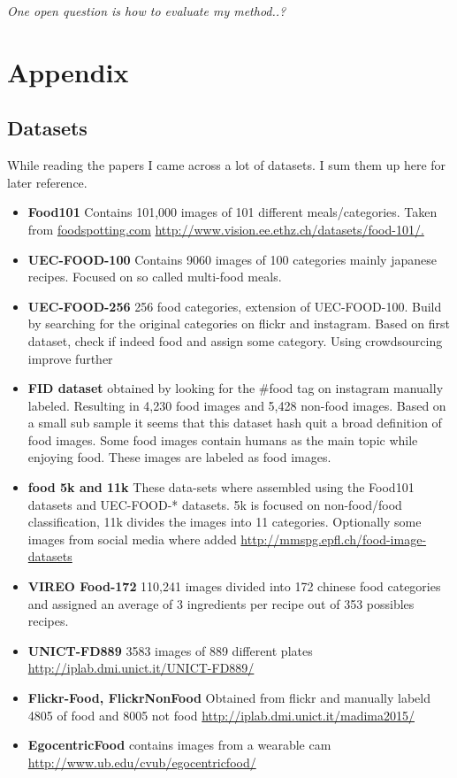 \documentclass[a4paper]{scrartcl}
\begin{document}
\textit{One open question is how to evaluate my method..?}


\section{Appendix}
\subsection{Datasets}

While reading the papers I came across a lot of datasets. I sum them up here for later reference. 
\begin{itemize}
\item \textbf{Food101} Contains 101,000 images of 101 different meals/categories. Taken from \url{foodspotting.com} \url{http://www.vision.ee.ethz.ch/datasets/food-101/.} \cite{bossard2014food}
\item \textbf{UEC-FOOD-100} Contains 9060 images of 100 categories mainly japanese recipes. Focused on so called multi-food meals. \cite{matsuda2012recognition}
\item \textbf{UEC-FOOD-256} 256 food categories, extension of UEC-FOOD-100. Build by searching for the original categories on flickr and instagram. Based on first dataset, check if indeed food and assign some category. Using crowdsourcing improve further \cite{kawano2014automatic}
\item \textbf{FID  dataset} obtained by looking for the \#food tag on instagram manually labeled. Resulting in 4,230
food images and 5,428 non-food images. Based on a small sub sample it seems that this dataset hash quit a broad definition of food images. Some food images contain humans as the main topic while enjoying food. These images are labeled as food images. \cite{kagaya2015highly}
\item \textbf{food 5k and 11k} These data-sets where assembled using the  Food101 datasets and UEC-FOOD-* datasets. 5k is focused on non-food/food classification, 11k divides the images into 11 categories. Optionally some images from social media where added \cite{singla2016food} \url{http://mmspg.epfl.ch/food-image-datasets}
\item \textbf{VIREO Food-172}  \cite{chen2016deep} 110,241 images divided into 172 chinese food categories and assigned an average of 3 ingredients per recipe out of 353 possibles recipes. \url{}
\item \textbf{UNICT-FD889} 3583 images of 889 different plates \cite{farinella2014benchmark} \url{http://iplab.dmi.unict.it/UNICT-FD889/}
\item \textbf{Flickr-Food, FlickrNonFood}  Obtained from flickr and manually labeld 4805 of food and 8005 not food \cite{farinella2015exploitation} \url{http://iplab.dmi.unict.it/madima2015/}
\item \textbf{EgocentricFood} contains images from a wearable cam \cite{bolanos2016simultaneous} \url{http://www.ub.edu/cvub/egocentricfood/}
\end{itemize}

\newpage


\end{document}
